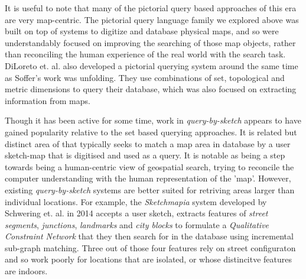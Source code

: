 %
\par{It is useful to note that many of the pictorial query based approaches of this era are very map-centric. 
The pictorial query language family we explored above was built on top of systems to digitize and database physical maps\cite{Samet1996,Samet1998}, and so were understandably focused on improving the searching of those map objects, rather than reconciling the human experience of the real world with the search task.
DiLoreto et. al. also developed a pictorial querying system around the same time as Soffer's work was unfolding. 
They use combinations of set, topological and metric dimensions to query their database, which was also focused on extracting information from maps.}
%
\par{Though it has been active for some time, work in \textit{query-by-sketch} appears to have gained popularity relative to the set based querying approaches. It is related but distinct area of that typically seeks to match a map area in database by a user sketch-map that is digitised and used as a query. 
It is notable as being a step towards being a human-centric view of geospatial search, trying to reconcile the computer understanding with the human representation of the 'map'. 
However, existing \textit{query-by-sketch} systems are better suited for retriving areas larger than individual locations.
For example, the \textit{Sketchmapia} system developed by Schwering et. al. in 2014 accepts a user sketch, extracts features of \textit{street segments}, \textit{junctions}, \textit{landmarks} and \textit{city blocks} to formulate a \textit{Qualitative Constraint Network} that they then search for in the database using incremental sub-graph matching. 
Three out of those four features rely on street configuraton and so work poorly for locations that are isolated, or whose distincitve features are indoors. 

}
